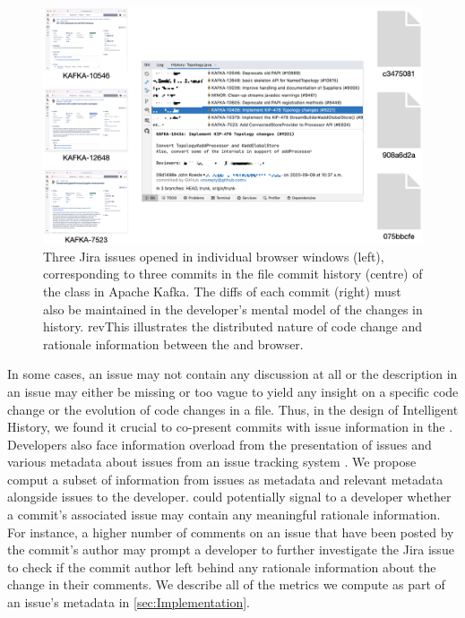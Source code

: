 \begin{figure}
    \center
    \includegraphics[width=\textwidth]{./images/cognitive-load.png}
    \caption{
        Three Jira issues opened in individual browser windows (left), corresponding to three commits in the file commit history (centre) of the  class in Apache Kafka. 
        The diffs of each commit (right) must also be maintained in the developer's mental model of the changes in history. 
        rev{This} illustrates the distributed nature of code change and rationale information between the  and browser.
    }
    \label{fig:Cognitive-Load}
\end{figure}

In some cases, an issue may not contain any discussion at all or the description in an issue may either be missing 
or too vague to yield any insight on a specific code change or the evolution of code changes in a file.
Thus, in the design of Intelligent History, we found it crucial to co-present commits with issue information in the .
Developers also face information overload from the presentation of issues and 
various metadata about issues from an issue tracking system \cite{baysal_issue-overload_2014,bertram_social-nature_2010}.
We propose comput a subset of information from issues as metadata and  relevant metadata
alongside issues to the developer.
 could potentially signal to a developer whether a commit's associated issue
may contain any meaningful rationale information. 
For instance, a higher number of comments on an issue that have been
posted by the commit's author may prompt a developer to further investigate the Jira issue to check if the
commit author left behind any rationale information about the change in their comments.
We describe all of the metrics we compute as part of an issue's metadata in \autoref{sec:Implementation}.

